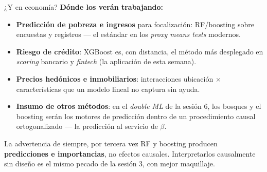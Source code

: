 \documentclass{beamer}
\newcommand{\1}{\mathbb{I}}
\begin{document}
\begin{frame}{¿Y en economía?}
\small
\textbf{Dónde los verán trabajando:}
\begin{itemize}\itemsep5pt
  \item \textbf{Predicción de pobreza e ingresos} para focalización: RF/boosting sobre encuestas y registros --- el estándar en los \emph{proxy means tests} modernos. \pause
  \item \textbf{Riesgo de crédito}: XGBoost es, con distancia, el método más desplegado en \emph{scoring} bancario y \emph{fintech} (la aplicación de esta semana). \pause
  \item \textbf{Precios hedónicos e inmobiliarios}: interacciones ubicación $\times$ características que un modelo lineal no captura sin ayuda. \pause
  \item \textbf{Insumo de otros métodos}: en el \emph{double ML} de la sesión 6, los bosques y el boosting serán los motores de predicción dentro de un procedimiento causal ortogonalizado --- la predicción al servicio de $\beta$.
\end{itemize}
\pause

\vspace{0.1cm}
\begin{block}{La advertencia de siempre, por tercera vez}
RF y boosting producen \textbf{predicciones e importancias}, no efectos causales. Interpretarlos causalmente sin diseño es el mismo pecado de la sesión 3, con mejor maquillaje.
\end{block}
\end{frame}
\end{document}
